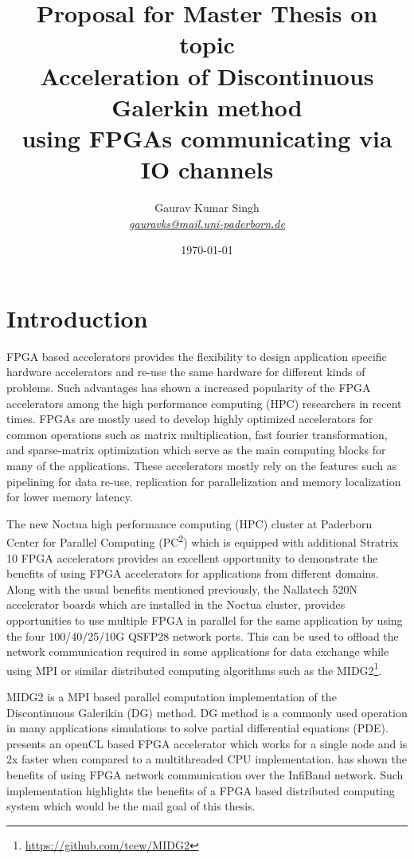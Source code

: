 \documentclass[english,notitlepage]{hgbreport}
\author{Gaurav Kumar Singh \\ \textit{\href{mailto:gauravks@mail.uni-paderborn.de}{gauravks@mail.uni-paderborn.de}}}
\title{Proposal for Master Thesis on topic \\
		Acceleration of Discontinuous Galerkin method \\
		using FPGAs communicating via IO channels}
\date{\today}
\begin{document}
\maketitle

\section{Introduction}

FPGA based accelerators provides the flexibility to design application specific hardware accelerators and re-use the same
hardware for different kinds of problems. Such advantages has shown a increased popularity of the FPGA accelerators among
the high performance computing (HPC) researchers in recent times. FPGAs are mostly used to develop highly
optimized accelerators for common operations such as matrix multiplication, fast fourier transformation,
and sparse-matrix optimization which serve as the main computing blocks for many of the applications. These accelerators
mostly rely on the features such as pipelining for data re-use, replication for parallelization and memory localization
for lower memory latency.

The new Noctua high performance computing (HPC) cluster at Paderborn Center for Parallel Computing  (PC\textsuperscript{2})
which is equipped with additional Stratrix 10 FPGA accelerators provides an excellent opportunity to demonstrate the benefits
of using FPGA accelerators for applications from different domains. Along with the usual benefits mentioned previously, the
Nallatech 520N accelerator boards which are installed in the Noctua cluster, provides opportunities to use multiple
FPGA in parallel for the same application by using the four 100/40/25/10G QSFP28 network ports. This can be used to offload
the network communication required in some applications for data exchange while using MPI or similar distributed computing
algorithms such as the MIDG2\footnote{\url{https://github.com/tcew/MIDG2}}.

MIDG2 is a MPI based parallel computation implementation of the Discontinuous Galerikin (DG) \cite{hesthaven_nodal_2008} method.
DG method is a commonly used operation in many applications simulations to solve partial differential equations (PDE).
\textcite{kenter_opencl-based_2018} presents an openCL based FPGA accelerator which works for a single node and is 2x faster
when compared to a multithreaded CPU implementation. \textcite{kobayashi_opencl-ready_2018} has shown the benefits of using
FPGA network communication over the InfiBand network. Such implementation highlights the benefits of a FPGA based distributed
computing system which would be the mail goal of this thesis.
\end{document}
